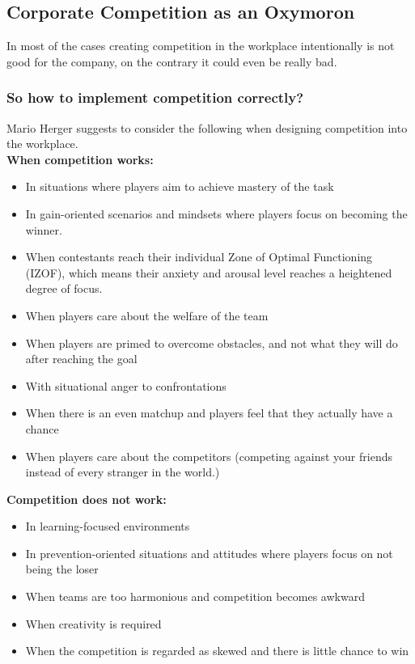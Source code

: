 \subsection{Corporate Competition as an Oxymoron}
In most of the cases creating competition in the workplace intentionally is not good for the company, on the contrary it could even be really bad.
\subsubsection{So how to implement competition correctly? }
Mario Herger suggests to consider the following when designing competition into the workplace.\\
\textbf{When competition works:}
\begin{itemize}
    \item In situations where players aim to achieve mastery of the task
    \item In gain-oriented scenarios and mindsets where players focus on becoming the winner.
    \item When contestants reach their individual Zone of Optimal Functioning (IZOF), which means their anxiety and arousal level reaches a heightened degree of focus.
    \item When players care about the welfare of the team
    \item When players are primed to overcome obstacles, and not what they will do after reaching the goal
    \item With situational anger to confrontations
    \item When there is an even matchup and players feel that they actually have a chance
    \item When players care about the competitors (competing against your friends instead of every stranger in the world.)
\end{itemize}
\textbf{Competition does not work:}
\begin{itemize}
    \item In learning-focused environments
    \item In prevention-oriented situations and attitudes where players focus on not being the loser
    \item When teams are too harmonious and competition becomes awkward
    \item When creativity is required
    \item When the competition is regarded as skewed and there is little chance to win
\end{itemize}

